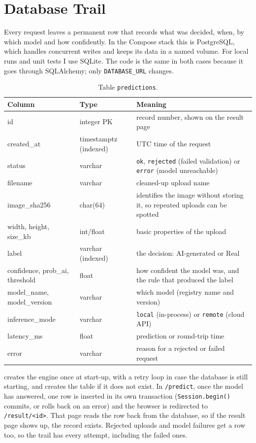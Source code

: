 \chapter{Database Trail}\label{ch:db}

Every request leaves a permanent row that records what was decided, when, by which model and how
confidently. In the Compose stack this is PostgreSQL, which handles concurrent writes and keeps its
data in a named volume. For local runs and unit tests I use SQLite. The code is the same in both
cases because it goes through SQLAlchemy; only \texttt{DATABASE\_URL} changes.

\begin{table}[H]\centering\small
\begin{tabularx}{\linewidth}{>{\ttfamily}l l X}
\toprule
Column & Type & Meaning \\
\midrule
id & integer PK & record number, shown on the result page \\
created\_at & timestamptz (indexed) & UTC time of the request \\
status & varchar & \texttt{ok}, \texttt{rejected} (failed validation) or \texttt{error} (model unreachable) \\
filename & varchar & cleaned-up upload name \\
image\_sha256 & char(64) & identifies the image without storing it, so repeated uploads can be spotted \\
width, height, size\_kb & int/float & basic properties of the upload \\
label & varchar (indexed) & the decision: AI-generated or Real \\
confidence, prob\_ai, threshold & float & how confident the model was, and the rule that produced the label \\
model\_name, model\_version & varchar & which model (registry name and version) \\
inference\_mode & varchar & \texttt{local} (in-process) or \texttt{remote} (cloud API) \\
latency\_ms & float & prediction or round-trip time \\
error & varchar & reason for a rejected or failed request \\
\bottomrule
\end{tabularx}
\caption{Table \texttt{predictions}.}\end{table}

 creates the engine once at start-up, with a retry loop in case the database is
still starting, and creates the table if it does not exist. In \texttt{/predict}, once the model
has answered, one row is inserted in its own transaction (\texttt{Session.begin()} commits, or rolls
back on an error) and the browser is redirected to \texttt{/result/<id>}. That page reads the row
back from the database, so if the result page shows up, the record exists. Rejected uploads and
model failures get a row too, so the trail has every attempt, including the failed ones.

